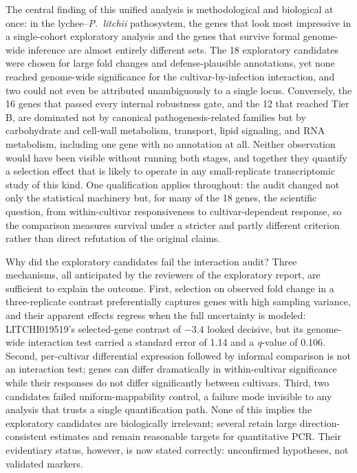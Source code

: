 \documentclass[11pt]{article}
\newcommand{\Pl}{\textit{P.~litchii}}
\newcommand{\q}{\textit{q}}
\begin{document}
The central finding of this unified analysis is methodological and biological at once: in the lychee--\Pl{} pathosystem, the genes that look most impressive in a single-cohort exploratory analysis and the genes that survive formal genome-wide inference are almost entirely different sets. The 18 exploratory candidates were chosen for large fold changes and defense-plausible annotations, yet none reached genome-wide significance for the cultivar-by-infection interaction, and two could not even be attributed unambiguously to a single locus. Conversely, the 16 genes that passed every internal robustness gate, and the 12 that reached Tier B, are dominated not by canonical pathogenesis-related families but by carbohydrate and cell-wall metabolism, transport, lipid signaling, and RNA metabolism, including one gene with no annotation at all. Neither observation would have been visible without running both stages, and together they quantify a selection effect that is likely to operate in any small-replicate transcriptomic study of this kind. One qualification applies throughout: the audit changed not only the statistical machinery but, for many of the 18 genes, the scientific question, from within-cultivar responsiveness to cultivar-dependent response, so the comparison measures survival under a stricter and partly different criterion rather than direct refutation of the original claims.

Why did the exploratory candidates fail the interaction audit? Three mechanisms, all anticipated by the reviewers of the exploratory report, are sufficient to explain the outcome. First, selection on observed fold change in a three-replicate contrast preferentially captures genes with high sampling variance, and their apparent effects regress when the full uncertainty is modeled: LITCHI019519's selected-gene contrast of $-3.4$ looked decisive, but its genome-wide interaction test carried a standard error of 1.14 and a \q-value of 0.106. Second, per-cultivar differential expression followed by informal comparison is not an interaction test; genes can differ dramatically in within-cultivar significance while their responses do not differ significantly between cultivars. Third, two candidates failed uniform-mappability control, a failure mode invisible to any analysis that trusts a single quantification path. None of this implies the exploratory candidates are biologically irrelevant; several retain large direction-consistent estimates and remain reasonable targets for quantitative PCR. Their evidentiary status, however, is now stated correctly: unconfirmed hypotheses, not validated markers.
\end{document}
